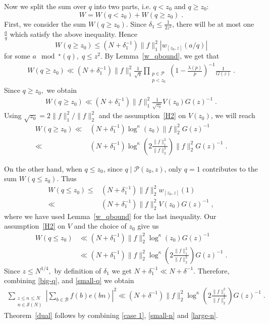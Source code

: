 \documentclass[12pt,article]{amsart}
\theoremstyle{remark}
\numberwithin{equation}{section}
\newcommand{\calP}{\mathcal{P}}
\begin{document}
	\noindent
	Now we split the sum over $q$ into two parts, i.e.  $q<z_0$ and $q\geq z_0$: 
	\[W=W(q<z_0)+W(q\geq z_0)\;.\]
	First, we consider the sum $W(q\geq z_0)$. 
	Since $\delta_1\leq \frac{1}{2z^4}$, there will be at most one $\frac{a}{q}$ which satisfy the above inequality. Hence
	\[
	W(q\geq z_0)\leq (N+\delta_1^{-1}) \|f\|_1^2|w_{[z_0,z]}(a/q)|
	\]
	for some $a \mod^{\star} ( q),\;  q\leq z^2$. By Lemma~\ref{w_qbound}, we get that
	\begin{align*}
		W(q\geq z_0)\ll (N+\delta_1^{-1}) \|f\|_1^2 \frac{1}{\sqrt{q}} \prod_{\substack{p\in \mathcal{P}\\ p< z_0}}\left(1-\frac{\lambda(p)}{p}\right)^{-1}\frac{1}{G(z)}\; .
	\end{align*}
	Since $q\geq z_0,$ we obtain
	\begin{align*}
		W(q\geq z_0) \ll (N+\delta_1^{-1}) \|f\|_1^2 \frac{1}{\sqrt{z_0}}V(z_0)G(z)^{-1}\; .
	\end{align*}
	Using $\sqrt{z_0}=2\|f\|_1^2/\|f\|_2^2$ and the assumption~\eqref{H2} on $V(z_0)$, we will reach
	\begin{align}
		\label{big-q}
		W(q\geq z_0)\ll&  (N+\delta_1^{-1}) \log^\kappa(z_0)\|f\|_2^2 G(z)^{-1}\nonumber\\
		\ll &(N+\delta_1^{-1}) \log^\kappa\left(2\frac{\|f\|_1^2}{\|f\|_2^2}\right)\|f\|_2^2 G(z)^{-1}\; .
	\end{align}
	
	\vspace{2mm}
	\noindent
	On the other hand, when $q\leq z_0$, since  $q\mid \calP(z_0,z)$, only $q=1$ contributes to the sum $W(q\leq z_0)$. Thus
	\begin{align*}
		W(q\leq z_0) \leq & (N+\delta_1^{-1})\|f\|_2^2 w_{[z_0, z]}(1)\\
		\ll & (N+\delta_1^{-1})\|f\|_2^2V(z_0)G(z)^{-1}\;,
	\end{align*}
	where we have used Lemma~\ref{w_qbound} for the last inequality.  Our assumption~\eqref{H2} on $V$ and the choice of $z_0$ give us 
	\begin{align}
		\label{small-q}
		W(q\leq z_0)&\ll   (N+\delta_1^{-1})\|f\|_2^2 \log^\kappa(z_0)G(z)^{-1}\nonumber\\
		&\ll  (N+\delta_1^{-1})\|f\|_2^2 \log^\kappa\left(2\frac{\|f\|_1^2}{\|f\|_2^2}\right)G(z)^{-1}\; .
	\end{align}
	Since $z\leq N^{1/4},$ by definition of $\delta_1$ we get $N+\delta_1^{-1}\ll N+\delta^{-1}.$ Therefore, combining \eqref{big-q}, and \eqref{small-q} we obtain
	\begin{align}
		\label{large-n} 
		\sum_{\substack{z\leq n\leq N\\ n\in \mathcal{S}(N)}}\left|\sum_{b\in \mathcal{B}}f(b)e(bn)\right|^2 \ll(N+\delta^{-1})\|f\|_2^2 \log^\kappa\left(2\frac{\|f\|_1^2}{\|f\|_2^2}\right)G(z)^{-1}\; .
	\end{align}
	Theorem~\ref{dual} follows by combining \eqref{case 1}, \eqref{small-n} and \eqref{large-n}. 
	
\end{document}
